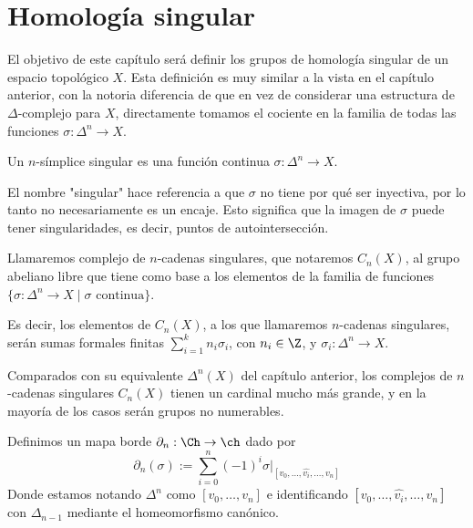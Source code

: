 \section{Homología singular}

El objetivo de este capítulo será definir los grupos de homología singular de un espacio topológico $X$. Esta definición es muy similar a la vista en el capítulo anterior, con la notoria diferencia de que en vez de considerar una estructura de $\Delta$-complejo para $X$, directamente tomamos el cociente en la familia de todas las funciones $\sigma:\Delta^n\to X$.

\begin{df}
    Un $n$-símplice singular es una función continua $\sigma:\Delta^n\to X$.
\end{df}

El nombre "singular" hace referencia a que $\sigma$ no tiene por qué ser inyectiva, por lo tanto no necesariamente es un encaje. Esto significa que la imagen de $\sigma$ puede tener singularidades, es decir, puntos de autointersección. \br


\begin{df}
    Llamaremos complejo de $n$-cadenas singulares, que notaremos $C_n(X)$, al grupo abeliano libre que tiene como base a los elementos de la familia de funciones $\{\sigma:\Delta^n\to X \;\vert\; \sigma \text{ continua}\}$. \br

    Es decir, los elementos de $C_n(X)$, a los que llamaremos $n$-cadenas singulares, serán sumas formales finitas $\sum_{i=1}^k n_i\sigma_i$, con $n_i\in\Z$, y $\sigma_i:\Delta^n\to X$.
\end{df}

Comparados con su equivalente $\Delta^n(X)$ del capítulo anterior, los complejos de $n$-cadenas singulares $C_n(X)$ tienen un cardinal mucho más grande, y en la mayoría de los casos serán  grupos no numerables. \br

\begin{df}
    Definimos un mapa borde $\partial_n:\Ch\to\ch$ dado por $$\partial_n(\sigma):= \sum\limits_{i=0}^{n}(-1)^i \sigma |_{[v_0,\dots,\hat{v_i},\dots,v_n]}$$ 
    Donde estamos notando $\Delta^n$ como $[v_0,\dots,v_n]$ e identificando $[v_0,\dots,\hat{v_i},\dots,v_n]$ con $\Delta_{n-1}$ mediante el homeomorfismo canónico.
\end{df}

